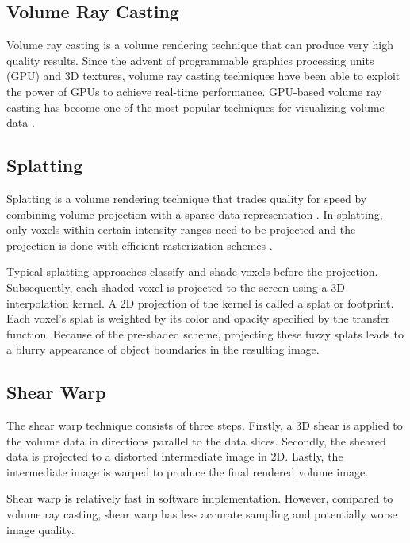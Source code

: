 \subsection{Volume Ray Casting}
Volume ray casting is a volume rendering technique that can produce very high quality results.
Since the advent of programmable graphics processing units (GPU) and 3D textures, volume ray casting techniques have been able to exploit the power of GPUs to achieve real-time performance. GPU-based volume ray casting has become one of the most popular techniques for visualizing volume data \cite{meyer-spradow_voreen:_2009}.

\subsection{Splatting}
Splatting is a volume rendering technique that trades quality for speed by combining volume projection with a sparse data representation \cite{westover_splatting:_1991}. In splatting, only voxels within certain intensity ranges need to be projected and the projection is done with efficient rasterization schemes \cite{mueller_splatting_1999}.

Typical splatting approaches classify and shade voxels before the projection. Subsequently, each shaded voxel is projected to the screen using a 3D interpolation kernel. A 2D projection of the kernel is called a splat or footprint.
Each voxel's splat is weighted by its color and opacity specified by the transfer function.
Because of the pre-shaded scheme, projecting these fuzzy splats leads to a blurry appearance of object boundaries in the resulting image.

\subsection{Shear Warp}
The shear warp technique \cite{lacroute_fast_1994} consists of three steps.
Firstly, a 3D shear is applied to the volume data in directions parallel to the data slices. Secondly, the sheared data is projected to a distorted intermediate image in 2D. Lastly, the intermediate image is warped to produce the final rendered volume image.

Shear warp is relatively fast in software implementation.
However, compared to volume ray casting, shear warp has less accurate sampling and potentially worse image quality.

